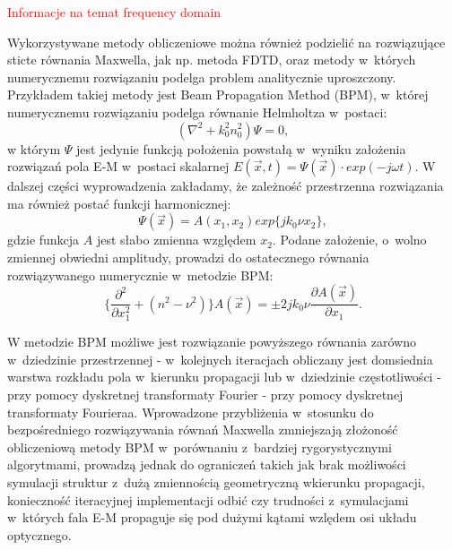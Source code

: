 \textcolor{red}{ Informacje na temat frequency domain}

Wykorzystywane metody obliczeniowe można również podzielić na rozwiązujące sticte równania Maxwella, jak np. metoda FDTD, oraz metody w~których numerycznemu rozwiązaniu podelga problem analitycznie uproszczony. Przykładem takiej metody jest Beam Propagation Method (BPM), w~której numerycznemu rozwiązaniu podelga równanie Helmholtza w~postaci:
\begin{equation}
 ( \nabla ^2 + k_0^2 n_0^2) \Psi = 0,
\end{equation}
w którym $\Psi$ jest jedynie funkcją położenia powstałą w~wyniku założenia rozwiązań pola E-M w~postaci skalarnej $E(\vec{x},t)=\Psi(\vec{x})\cdot exp(-j\omega t)$. W dalszej części wyprowadzenia zakładamy, że zależność przestrzenna rozwiązania ma również postać funkcji harmonicznej:
\begin{equation}
\Psi(\vec{x})=A(x_1,x_2) exp\{jk_0\nu x_2\}, 
\end{equation}
gdzie funkcja $A$ jest słabo zmienna względem $x_2$. Podane założenie, o~wolno zmiennej obwiedni amplitudy, prowadzi do ostatecznego równania rozwiązywanego numerycznie w~metodzie BPM:
\begin{equation}
 \{  \frac{\partial^2 }{\partial x_1^2 } + (n^2 - \nu^2) \} A(\vec{x}) = \pm  2jk_0\nu \frac{\partial A (\vec{x})}{\partial x_1}.
\end{equation}

W metodzie BPM możliwe jest rozwiązanie powyższego równania zarówno w~dziedzinie przestrzennej - w~kolejnych iteracjach obliczany jest domsiednia warstwa rozkładu pola w~kierunku propagacji lub w~dziedzinie częstotliwości - przy pomocy dyskretnej transformaty Fourier - przy pomocy dyskretnej transformaty Fourieraa. Wprowadzone przybliżenia w~stosunku do bezpośredniego rozwiązywania równań Maxwella zmniejszają złożoność obliczeniową metody BPM w~porównaniu z~bardziej rygorystycznymi algorytmami, prowadzą jednak do ograniczeń takich jak brak możliwości symulacji struktur z~dużą zmiennością geometryczną wkierunku propagacji, konieczność iteracyjnej implementacji odbić czy trudności z~symulacjami w~których fala E-M propaguje się pod dużymi kątami wzlędem osi układu optycznego.



 
